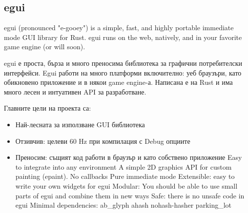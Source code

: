 \subsection{egui}
egui (pronounced "e-gooey") is a simple, fast, and highly portable immediate
mode GUI library for Rust. egui runs on the web, natively, and in your favorite
game engine (or will soon).

egui е проста, бърза и много преносима библиотека за графични потребителски
интерфейси. Egui работи на много платформи включително: уеб браузъри, като
обикновено приложение и в някои game engine-а. Написана е на Rust и има много
лесен и интуативен API за разработване.

Главните цели на проекта са:
\begin{itemize}
    \item Най-лесната за използване GUI библиотека
    \item Отзивчив: целеви 60 Hz при компилация с Debug опциите
    \item Преносим: същият код работи в браузър и като собствено приложение
    Easy to integrate into any environment
    A simple 2D graphics API for custom painting (epaint).
    No callbacks
    Pure immediate mode
    Extensible: easy to write your own widgets for egui
    Modular: You should be able to use small parts of egui and combine them in new ways
    Safe: there is no unsafe code in egui
    Minimal dependencies: ab_glyph ahash nohash-hasher parking_lot
\end{itemize}

